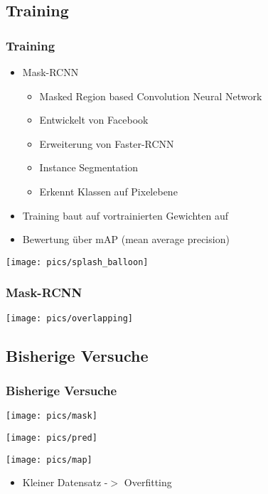 \documentclass{beamer}
\begin{document}

\begin{frame}\section{Training}\frametitle{Training}
\begin{minipage}{0.55\textwidth}
	\begin{itemize}
		\item Mask-RCNN
		\begin{itemize}
			\item Masked Region based Convolution Neural Network
			\item Entwickelt von Facebook
			\item Erweiterung von Faster-RCNN
			\item Instance Segmentation
			\item Erkennt Klassen auf Pixelebene
		\end{itemize}
		\item Training baut auf vortrainierten Gewichten auf
		\item Bewertung über mAP (mean average precision)
	\end{itemize}
\end{minipage}
\begin{minipage}{0.4\textwidth}
	\texttt{[image: pics/splash\_balloon]}
\end{minipage}
\end{frame}

\begin{frame}\frametitle{Mask-RCNN}
	\texttt{[image: pics/overlapping]}
\end{frame}


\begin{frame}\section{Bisherige Versuche}\frametitle{Bisherige Versuche}
\begin{minipage}{0.5\textwidth}
	\texttt{[image: pics/mask]}
\end{minipage}
\hspace{1em}
\begin{minipage}{0.4\textwidth}
	\texttt{[image: pics/pred]}
\end{minipage}
\center
\texttt{[image: pics/map]}
\begin{itemize}
	\item Kleiner Datensatz -$>$ Overfitting
\end{itemize}
\end{frame}
\end{document}
